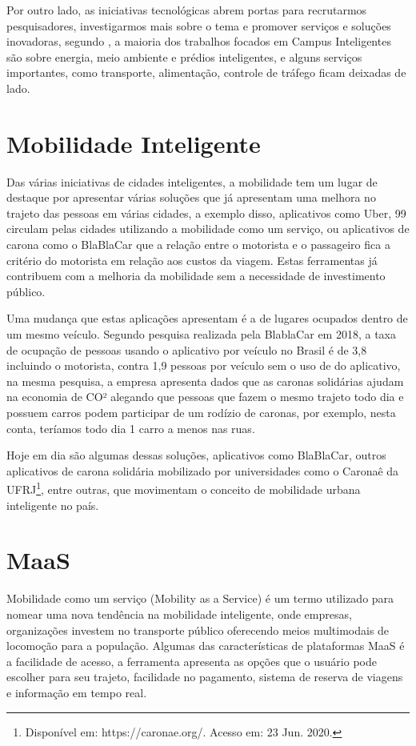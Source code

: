 Por outro lado, as iniciativas tecnológicas abrem portas para recrutarmos pesquisadores, investigarmos mais sobre o tema e promover serviços e soluções inovadoras, segundo \cite{alghamdi}, a maioria dos trabalhos focados em Campus Inteligentes são sobre energia, meio ambiente e prédios inteligentes, e alguns serviços importantes, como transporte, alimentação, controle de tráfego ficam deixadas de lado.
\section{Mobilidade Inteligente}

Das várias iniciativas de cidades inteligentes, a mobilidade tem um lugar de destaque por apresentar várias soluções que já apresentam uma melhora no trajeto das pessoas em várias cidades, a exemplo disso, aplicativos como Uber, 99 circulam pelas cidades utilizando a mobilidade como um serviço, ou aplicativos de carona como o BlaBlaCar  que a relação entre o motorista e o passageiro fica a critério do motorista em relação aos custos da viagem. Estas ferramentas já contribuem com a melhoria da mobilidade sem a necessidade de investimento público. 

Uma mudança que estas aplicações apresentam é a de lugares ocupados dentro de um mesmo veículo. Segundo pesquisa realizada pela BlablaCar em 2018, a taxa de ocupação de pessoas usando o aplicativo por veículo no Brasil é de 3,8 incluindo o motorista, contra 1,9 pessoas por veículo sem o uso de do aplicativo, na mesma pesquisa, a empresa apresenta dados que as caronas solidárias ajudam na economia de CO² alegando que pessoas que  fazem o mesmo trajeto todo dia e possuem carros podem participar de um rodízio de caronas, por exemplo, nesta conta, teríamos todo dia 1 carro a menos nas ruas.

Hoje em dia são algumas dessas soluções, aplicativos como BlaBlaCar, outros aplicativos de carona solidária mobilizado por universidades como o Caronaê da UFRJ\footnote{Disponível em: https://caronae.org/. Acesso em: 23 Jun. 2020.}, entre outras,  que movimentam o conceito de mobilidade urbana inteligente no país.

\section{MaaS}

Mobilidade como um serviço (Mobility as a Service) é um termo utilizado para nomear uma nova tendência na mobilidade inteligente, onde empresas, organizações investem no transporte público oferecendo meios multimodais de locomoção  para a população. Algumas das características de plataformas MaaS é a facilidade de acesso, a ferramenta apresenta as opções que o usuário pode escolher para seu trajeto, facilidade no pagamento, sistema de reserva de viagens e informação em tempo real.

